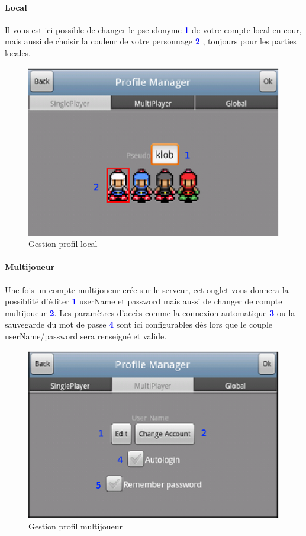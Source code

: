 		\paragraph{Local\\}
		Il vous est ici possible de changer le pseudonyme \textcolor{blue}{\textbf{1}}
		de votre compte local en cour, mais aussi de choisir la couleur de votre
		personnage \textcolor{blue}{\textbf{2}} , toujours pour les parties locales.
		\begin{figure}[h]
			\centering
				\includegraphics[scale=0.7]{Manuel/Img/5.eps}
				\caption{Gestion profil local}
			\end{figure}
		
		\paragraph{Multijoueur\\}
		Une fois un compte multijoueur crée sur le serveur, cet onglet vous donnera la
		possiblité d'éditer \textcolor{blue}{\textbf{1}} userName et password mais
		aussi de changer de compte multijoueur \textcolor{blue}{\textbf{2}}. Les
		paramètres d'accès comme la connexion automatique
		\textcolor{blue}{\textbf{3}} ou la sauvegarde du mot de passe
		\textcolor{blue}{\textbf{4}} sont ici configurables dès lors que le couple
		userName/password sera renseigné et valide.
		
		\begin{figure}[h]
			\centering
				\includegraphics[scale=0.7]{Manuel/Img/6.eps}
				\caption{Gestion profil multijoueur}
			\end{figure}
		
